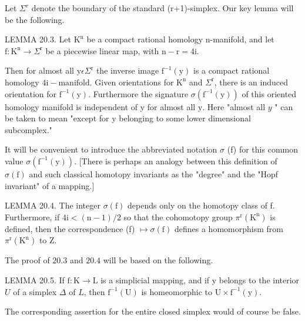 \documentclass[10pt]{article}
\begin{document}
Let $\Sigma^{r}$ denote the boundary of the standard (r+1)-simplex. Our key lemma will be the following.

LEMMA 20.3. Let $\mathrm{K}^{\mathrm{n}}$ be a compact rational homology $\mathrm{n}$-manifold, and let $\mathrm{f}: \mathrm{K}^{\mathrm{n}} \rightarrow \Sigma^{\mathrm{r}}$ be a piecewise linear map, with $\mathrm{n}-\mathrm{r}=4 \mathrm{i}$.

Then for almost all $\mathrm{y} \epsilon \Sigma^{\mathrm{r}}$ the inverse image $\mathrm{f}^{-1}(\mathrm{y})$ is a compact rational homology $4 \mathrm{i}-\mathrm{manifold}$. Given orientations for $\mathrm{K}^{\mathrm{n}}$ and $\Sigma^{\mathrm{r}}$, there is an induced orientation for $\mathrm{f}^{-1}(\mathrm{y})$. Furthermore the signature $\sigma\left(\mathrm{f}^{-1}(\mathrm{y})\right)$ of this oriented homology manifold is independent of $\mathrm{y}$ for almost all $\mathrm{y}$. Here "almost all $y$ " can be taken to mean "except for y belonging to some lower dimensional subcomplex."

It will be convenient to introduce the abbreviated notation $\sigma$ (f) for this common value $\sigma\left(\mathrm{f}^{-1}(\mathrm{y})\right)$. [There is perhaps an analogy between this definition of $\sigma(\mathrm{f})$ and such classical homotopy invariants as the "degree" and the "Hopf invariant" of a mapping.]

LEMMA 20.4. The integer $\sigma(\mathrm{f})$ depends only on the homotopy class of f. Furthermore, if $4 \mathrm{i}<(\mathrm{n}-1) / 2$ so that the cohomotopy group $\pi^{\mathrm{r}}\left(\mathrm{K}^{\mathrm{n}}\right)$ is defined, then the correspondence (f) $\mapsto \sigma(\mathrm{f})$ defines a homomorphism from $\pi^{\mathrm{r}}\left(\mathrm{K}^{\mathrm{n}}\right)$ to $\mathrm{Z}$.

The proof of $20.3$ and $20.4$ will be based on the following.

LEMMA 20.5. If $\mathrm{f}: \mathrm{K} \rightarrow \mathrm{L}$ is a simplicial mapping, and if $\mathrm{y}$ belongs to the interior $U$ of a simplex $\Delta$ of $L$, then $\mathrm{f}^{-1}(\mathrm{U})$ is homeomorphic to $\mathrm{U} \times \mathrm{f}^{-1}(\mathrm{y})$.

The corresponding assertion for the entire closed simplex would of course be false.
\end{document}
